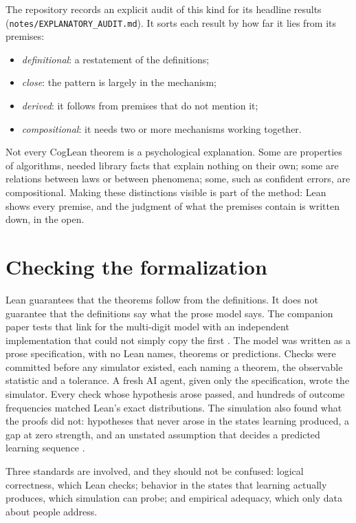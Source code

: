 \documentclass[11pt]{article}
\newcommand{\code}[1]{\texttt{#1}}
\begin{document}
The repository records an explicit audit of this kind for its headline results (\code{notes/EXPLANATORY\_AUDIT.md}). It sorts each result by how far it lies from its premises:
\begin{itemize}
  \item \emph{definitional}: a restatement of the definitions;
  \item \emph{close}: the pattern is largely in the mechanism;
  \item \emph{derived}: it follows from premises that do not mention it;
  \item \emph{compositional}: it needs two or more mechanisms working together.
\end{itemize}
Not every CogLean theorem is a psychological explanation. Some are properties of algorithms, needed library facts that explain nothing on their own; some are relations between laws or between phenomena; some, such as confident errors, are compositional. Making these distinctions visible is part of the method: Lean shows every premise, and the judgment of what the premises contain is written down, in the open.

\section{Checking the formalization}
\label{sec:sim}

Lean guarantees that the theorems follow from the definitions. It does not guarantee that the definitions say what the prose model says. The companion paper tests that link for the multi-digit model with an independent implementation that could not simply copy the first \citep[cf.\ N-version programming,][]{avizienis1985}. The model was written as a prose specification, with no Lean names, theorems or predictions. Checks were committed before any simulator existed, each naming a theorem, the observable statistic and a tolerance. A fresh AI agent, given only the specification, wrote the simulator. Every check whose hypothesis arose passed, and hundreds of outcome frequencies matched Lean's exact distributions. The simulation also found what the proofs did not: hypotheses that never arose in the states learning produced, a gap at zero strength, and an unstated assumption that decides a predicted learning sequence \citep{shrager2026multidigit}.

Three standards are involved, and they should not be confused: logical correctness, which Lean checks; behavior in the states that learning actually produces, which simulation can probe; and empirical adequacy, which only data about people address.
\end{document}
